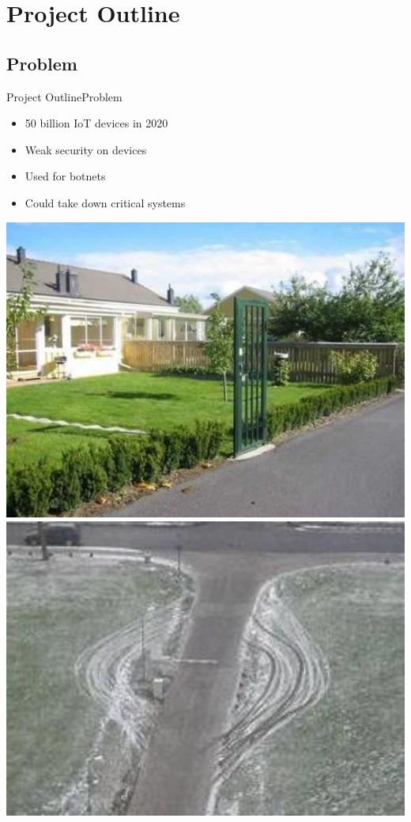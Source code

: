 \section{Project Outline}
\subsection{Problem}
\begin{frame}{Project Outline}{Problem}

\begin{minipage}{0.48\textwidth}
	\begin{itemize}
		\item 50 billion IoT devices in 2020
		\item Weak security on devices
		\item Used for botnets
		\item Could take down critical systems

	\end{itemize}
\end{minipage}
\hfill
\begin{minipage}{0.48\textwidth}
	\includegraphics[width=1\textwidth]{figs/low-firewall}
	\vspace{0.5cm}
	\includegraphics[width=1\textwidth]{figs/bad-security}
\end{minipage}
\end{frame}




